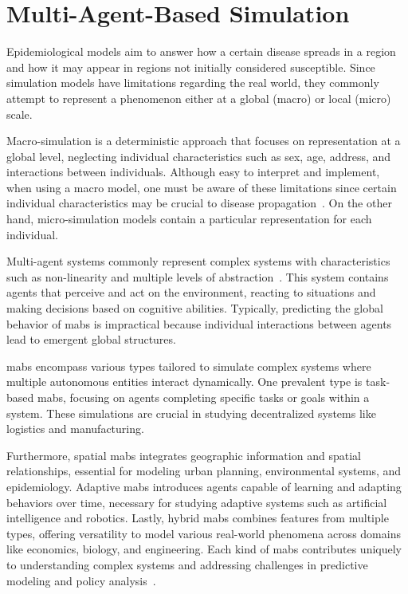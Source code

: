 \section{Multi-Agent-Based Simulation}\label{sec:multi-agent-simulation}

Epidemiological models aim to answer how a certain disease spreads in a region
and how it may appear in regions not initially considered susceptible. Since
simulation models have limitations regarding the real world, they commonly
attempt to represent a phenomenon either at a global (macro) or local (micro)
scale.

Macro-simulation is a deterministic approach that focuses on representation at a
global level, neglecting individual characteristics such as sex, age, address,
and interactions between individuals. Although easy to interpret and implement,
when using a macro model, one must be aware of these limitations since certain
individual characteristics may be crucial to disease
propagation~\citep{damien:2017}. On the other hand, micro-simulation models
contain a particular representation for each individual.

Multi-agent systems commonly represent complex systems with characteristics such
as non-linearity and multiple levels of abstraction~\citep{furtado:2015}. This
system contains agents that perceive and act on the environment, reacting to
situations and making decisions based on cognitive abilities. Typically,
predicting the global behavior of \gls{mabs} is impractical because individual
interactions between agents lead to emergent global structures.

\gls{mabs} encompass various types tailored to simulate complex systems where
multiple autonomous entities interact dynamically. One prevalent type is
task-based \gls{mabs}, focusing on agents completing specific tasks or goals
within a system. These simulations are crucial in studying decentralized systems
like logistics and manufacturing.

Furthermore, spatial \gls{mabs} integrates geographic information and spatial
relationships, essential for modeling urban planning, environmental systems, and
epidemiology. Adaptive \gls{mabs} introduces agents capable of learning and
adapting behaviors over time, necessary for studying adaptive systems such as
artificial intelligence and robotics. Lastly, hybrid \gls{mabs} combines
features from multiple types, offering versatility to model various real-world
phenomena across domains like economics, biology, and engineering. Each kind of
\gls{mabs} contributes uniquely to understanding complex systems and addressing
challenges in predictive modeling and policy analysis~\citep{Bonabeau:2002}.

